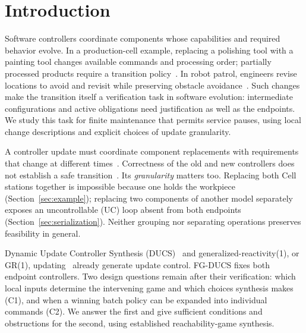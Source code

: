 \documentclass[acmsmall,screen,review,anonymous]{acmart}
\begin{document}
\section{Introduction}
\label{sec:introduction}
Software controllers coordinate components whose capabilities and required behavior evolve. In a production-cell example, replacing a polishing tool with a painting tool changes available commands and processing order; partially processed products require a transition policy~\cite[Sec.~2]{Nahabedian2020}. In robot patrol, engineers revise locations to avoid and revisit while preserving obstacle avoidance~\cite[Sec.~1.1]{Amram2022GR1DynamicUpdate}. Such changes make the transition itself a verification task in software evolution: intermediate configurations and active obligations need justification as well as the endpoints. We study this task for finite maintenance that permits service pauses, using local change descriptions and explicit choices of update granularity.

A controller update must coordinate component replacements with requirements that change at different times~\cite{Cheng2009SASRoadmap,Andersson2013SEAMSProcesses,Ghezzi2012DynamicScenarioUpdate,PanzicaLaManna2013CorrectnessDynamicUpdates}. Correctness of the old and new controllers does not establish a safe transition~\cite{Nahabedian2020,Amram2022GR1DynamicUpdate}. Its \emph{granularity} matters too. Replacing both Cell stations together is impossible because one holds the workpiece (Section~\ref{sec:example}); replacing two components of another model separately exposes an uncontrollable (UC) loop absent from both endpoints (Section~\ref{sec:serialization}). Neither grouping nor separating operations preserves feasibility in general.

Dynamic Update Controller Synthesis (DUCS)~\cite{Nahabedian2016SEAMS,Nahabedian2020} and generalized-reactivity(1), or GR(1), updating~\cite{Amram2022GR1DynamicUpdate} already generate update control. FG-DUCS fixes both endpoint controllers. Two design questions remain after their verification: which local inputs determine the intervening game and which choices synthesis makes (C1), and when a winning batch policy can be expanded into individual commands (C2). We answer the first and give sufficient conditions and obstructions for the second, using established reachability-game synthesis.
\end{document}
